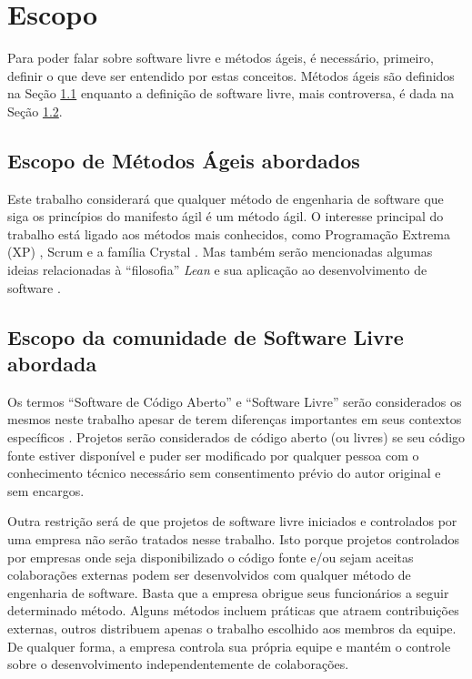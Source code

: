\chapter{Escopo}
\label{cap:escopo}

Para poder falar sobre software livre e métodos ágeis, é necessário,
primeiro, definir o que deve ser entendido por estas conceitos. Métodos
ágeis são definidos na Seção \ref{sec:agile-def} enquanto a definição
de software livre, mais controversa, é dada na Seção \ref{sec:os-def}.

\section{Escopo de Métodos Ágeis abordados}
\label{sec:agile-def}

Este trabalho considerará que qualquer método de engenharia de
software que siga os princípios do manifesto ágil
\cite{AgileManifesto} é um método ágil. O interesse principal do
trabalho está ligado aos métodos mais conhecidos, como Programação
Extrema (XP) \cite{XP02}, Scrum \cite{Schwaber2004} e a família
Crystal \cite{Cockburn2002}. Mas também serão mencionadas algumas
ideias relacionadas à ``filosofia'' \emph{Lean} \cite{Ohno1998} e sua
aplicação ao desenvolvimento de software \cite{Poppendieck2005}.

\section{Escopo da comunidade de Software Livre abordada}
\label{sec:os-def}

Os termos ``Software de Código Aberto'' e ``Software Livre'' serão
considerados os mesmos neste trabalho apesar de terem diferenças
importantes em seus contextos específicos \cite[Ch. 1, Free Versus
Open source]{Fogel2005}. Projetos serão considerados de código aberto
(ou livres) se seu código fonte estiver disponível e puder ser
modificado por qualquer pessoa com o conhecimento técnico necessário
sem consentimento prévio do autor original e sem encargos.

Outra restrição será de que projetos de software livre iniciados e
controlados por uma empresa não serão tratados nesse trabalho. Isto
porque projetos controlados por empresas onde seja disponibilizado o
código fonte e/ou sejam aceitas colaborações externas podem ser
desenvolvidos com qualquer método de engenharia de software. Basta que
a empresa obrigue seus funcionários a seguir determinado
método. Alguns métodos incluem práticas que atraem contribuições
externas, outros distribuem apenas o trabalho escolhido aos membros da
equipe. De qualquer forma, a empresa controla sua própria equipe e
mantém o controle sobre o desenvolvimento independentemente de
colaborações.

